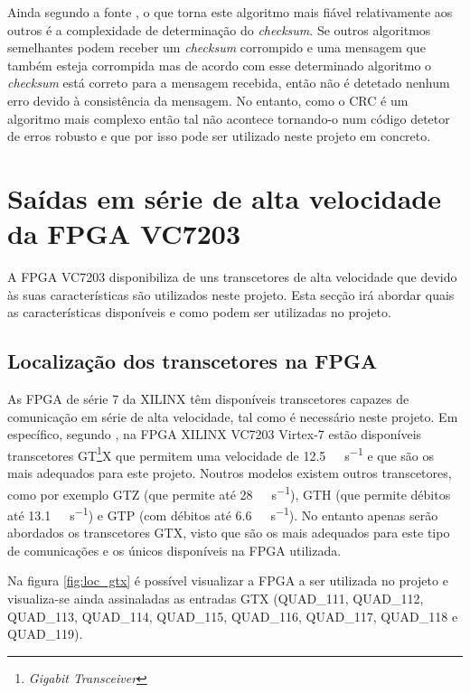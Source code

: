 Ainda segundo a fonte \cite{R028}, o que torna este algoritmo mais fiável relativamente aos outros é a complexidade de determinação do \textit{checksum}. Se outros algoritmos semelhantes podem receber um \textit{checksum} corrompido e uma mensagem que também esteja corrompida mas de acordo com esse determinado algoritmo o \textit{checksum} está correto para a mensagem recebida, então não é detetado nenhum erro devido à consistência da mensagem. No entanto, como o CRC é um algoritmo mais complexo então tal não acontece tornando-o num código detetor de erros robusto e que por isso pode ser utilizado neste projeto em concreto.



\section{Saídas em série de alta velocidade da FPGA VC7203}

A FPGA VC7203 disponibiliza de uns transcetores de alta velocidade que devido às suas características são utilizados neste projeto. Esta secção irá abordar quais as características disponíveis e como podem ser utilizadas no projeto.


\subsection{Localização dos transcetores na FPGA}

As FPGA de série 7 da XILINX têm disponíveis transcetores capazes de comunicação em série de alta velocidade, tal como é necessário neste projeto. Em específico, segundo \cite{R010}, na FPGA XILINX VC7203 Virtex-7 estão disponíveis transcetores GT\footnote{\textit{Gigabit Transceiver}}X que permitem uma velocidade de \SI{12.5}{\giga\bit\per\second} e que são os mais adequados para este projeto. Noutros modelos existem outros transcetores, como por exemplo GTZ (que permite até \SI{28}{\giga\bit\per\second}), GTH (que permite débitos até \SI{13.1}{\giga\bit\per\second}) e GTP (com débitos até \SI{6.6}{\giga\bit\per\second}). No entanto apenas serão abordados os transcetores GTX, visto que são os mais adequados para este tipo de comunicações e os únicos disponíveis na FPGA utilizada. 

Na figura \ref{fig:loc_gtx} é possível visualizar a FPGA a ser utilizada no projeto e visualiza-se ainda assinaladas as entradas GTX (QUAD\_111, QUAD\_112, QUAD\_113, QUAD\_114, QUAD\_115, QUAD\_116, QUAD\_117, QUAD\_118 e QUAD\_119).
 
